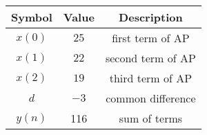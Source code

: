 \begin{tabular}{|c|c|c|}
		\hline
		\textbf{Symbol} & \textbf{Value} &
		\textbf{Description}\\[6pt]
		\hline
		$x(0)$ & $25$ & first term of AP\\[6pt]
		\hline
		$x(1)$ & $22$ & second term of AP\\[6pt]
		\hline
		$x(2)$ & $19$ & third term of AP\\[6pt]
		\hline
		$d$ & $-3$ & common difference\\[6pt]
		\hline
		$y(n)$ & 116 & sum of terms\\[6pt]
		\hline 
	\end{tabular}
	
